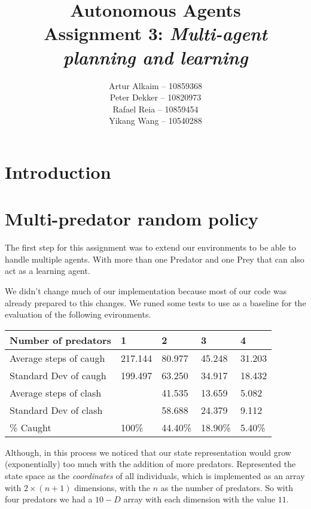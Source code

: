 \documentclass{article}
\begin{document}
\title{Autonomous Agents\\
Assignment 3: \emph{Multi-agent planning and learning}}
\author{
Artur Alkaim -- 10859368\\
Peter Dekker -- 10820973\\
Rafael Reia -- 10859454\\
Yikang Wang -- 10540288\\
}
\maketitle
\section{Introduction}

\section{Multi-predator random policy}
The first step for this assignment was to extend our environments to be able to
handle multiple agents. With more than one Predator and one Prey that can also
act as a learning agent.

We didn't change much of our implementation because most of our code was
already prepared to this changes. We runed some tests to use as a baseline for
the evaluation of the following evironments.

\begin{table}[h]
\begin{tabular}{|l|l|l|l|l|}
\hline
Number of predators    & 1       & 2       & 3       & 4      \\ \hline
Average steps of caugh & 217.144 & 80.977  & 45.248  & 31.203 \\ \hline
Standard Dev of caugh  & 199.497 & 63.250  & 34.917  & 18.432 \\ \hline
Average steps of clash &         & 41.535  & 13.659  & 5.082  \\ \hline
Standard Dev of clash  &         & 58.688  & 24.379  & 9.112  \\ \hline
\% Caught              & 100\%   & 44.40\% & 18.90\% & 5.40\% \\ \hline
\end{tabular}
\end{table}

Although, in this process we noticed that our state representation would grow
(exponentially) too much with the addition of more predators. Represented the
state space as the \emph{coordinates} of all individuals, which is implemented as
an array with $2 \times (n+1)$ dimensions, with the $n$ as the number of
predators. So with four predators we had a $10-D$ array with each dimension
with the value $11$.
\end{document}

